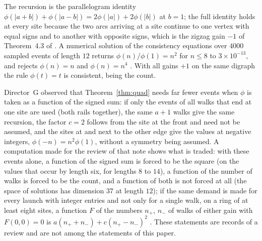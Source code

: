 The recursion is the parallelogram identity $\phi(|a+b|)+\phi(|a-b|)=2\phi(|a|)+2\phi(|b|)$ at $b=1$; the full identity holds at every site because the two arcs arriving at a site continue to one vertex with equal signs and to another with opposite signs, which is the zigzag gain $-1$ of Theorem~4.3 of \cite{g9}. A numerical solution of the consistency equations over $4000$ sampled events of length $12$ returns $\phi(n)/\phi(1)=n^2$ for $n\le8$ to $3\times10^{-13}$, and rejects $\phi(n)=n$ and $\phi(n)=n^4$ \cite{comp4s}. With all gains $+1$ on the same digraph the rule $\phi(t)=t$ is consistent, being the count.

Director~G observed \cite{dgg1} that Theorem~\ref{thm:quad} needs far fewer events when $\phi$ is taken as a function of the signed sum: if only the events of all walks that end at one site are used (both rails together), the same $a+1$ walks give the same recursion, the factor $c=2$ follows from the site at the front and need not be assumed, and the sites at and next to the other edge give the values at negative integers, $\phi(-n)=n^2\phi(1)$, without a symmetry being assumed. A computation made for the review of that note shows what is traded: with these events alone, a function of the signed sum is forced to be the square (on the values that occur by length six, for lengths $8$ to $14$), a function of the number of walks is forced to be the count, and a function of both is not forced at all (the space of solutions has dimension $37$ at length $12$); if the same demand is made for every launch with integer entries and not only for a single walk, on a ring of at least eight sites, a function $F$ of the numbers $n_+$, $n_-$ of walks of either gain with $F(0,0)=0$ is $a(n_++n_-)+c(n_+-n_-)^2$ \cite{comp4s}. These statements are records of a review and are not among the statements of this paper.

